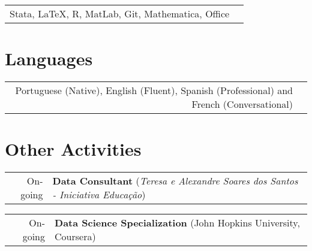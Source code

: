 \documentclass[a4paper,11pt]{article} %
\begin{document}
\begin{tabular}{rl}
	Stata, {\fb \LaTeX}, \textsc{R}, MatLab, Git, Mathematica, Office
\end{tabular}


\section[Languages]{\faLanguage \hspace{3pt} Languages}

\begin{tabular}{rp{15cm}}
	Portuguese (Native), English (Fluent), Spanish (Professional) and French (Conversational)
	
\end{tabular}

%
%	



\section[Other Activities]{\faCubes \hspace{3pt} Other Activities}

\begin{tabular}{r|p{15cm}}
	On-going & \textbf{Data Consultant} (\textit{Teresa e Alexandre Soares dos Santos - Iniciativa Educação})
\end{tabular}

\begin{tabular}{r|p{15cm}}
	On-going & \textbf{Data Science Specialization} (John Hopkins University, Coursera)
\end{tabular}
\end{document}
